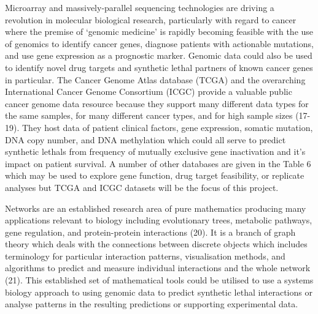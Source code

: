 Microarray and massively-parallel sequencing technologies are driving a revolution in molecular biological research, particularly with regard to cancer where the premise of ‘genomic medicine’ is rapidly becoming feasible with the use of \gls{genomics} to identify cancer genes, diagnose patients with actionable mutations, and use gene expression as a prognostic marker. Genomic data could also be used to identify novel drug targets and \gls{synthetic lethal} partners of known cancer genes in particular. The Cancer Genome Atlas database (\gls{TCGA}) and the overarching International Cancer Genome Consortium (ICGC) provide a valuable public cancer genome data resource because they support many different data types for the same samples, for many different cancer types, and for high sample sizes (17-19). They host data of patient clinical factors, gene expression, somatic mutation, DNA copy number, and DNA methylation which could all serve to predict \glspl{synthetic lethal} from frequency of mutually exclusive gene inactivation and it’s impact on patient survival. A number of other databases are given in the Table 6 which may be used to explore gene function, drug target feasibility, or replicate analyses but \gls{TCGA} and \gls{ICGC} datasets will be the focus of this project.

Networks are an established research area of pure mathematics producing many applications relevant to biology including evolutionary trees, metabolic pathways, gene regulation, and protein-protein interactions (20). It is a branch of graph theory which deals with the connections between discrete objects which includes terminology for particular interaction patterns, visualisation methods, and algorithms to predict and measure individual interactions and the whole network (21). This established set of mathematical tools could be utilised to use a systems biology approach to using genomic data to predict \gls{synthetic lethal} interactions or analyse patterns in the resulting predictions or supporting experimental data.

